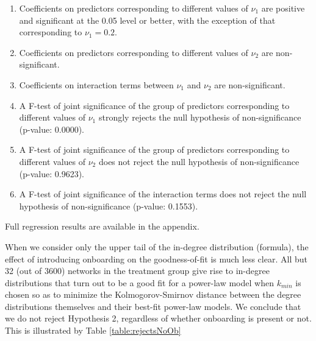 \begin{enumerate}
\item Coefficients on predictors corresponding to different values of $\nu_1$ are positive and significant at the 0.05 level or better, with the exception of that corresponding to $\nu_1 = 0.2$.
\item Coefficients on predictors corresponding to different values of $\nu_2$ are non-significant.
\item Coefficients on interaction terms between $\nu_1$ and $\nu_2$ are non-significant.
\item A F-test of joint significance of the group of predictors corresponding to different values of $\nu_1$ strongly rejects the null hypothesis of non-significance (p-value: 0.0000).
\item A F-test of joint significance of the group of predictors corresponding to different values of $\nu_2$ does not reject the null hypothesis of non-significance (p-value: 0.9623).
\item A F-test of joint significance of the interaction terms does not reject the null hypothesis of non-significance (p-value: 0.1553).
\end{enumerate}

Full regression results are available in the appendix.

When we consider only the upper tail of the in-degree distribution (formula), the effect of introducing onboarding on the goodness-of-fit is much less clear. All but 32 (out of 3600) networks in the treatment group give rise to in-degree distributions that turn out to be a good fit for a power-law model when $k_{min}$ is chosen so as to minimize the Kolmogorov-Smirnov distance between the degree distributions themselves and their best-fit power-law models. We conclude that we do not reject Hypothesis 2, regardless of whether onboarding is present or not. This is illustrated by Table \ref{table:rejectsNoOb}

